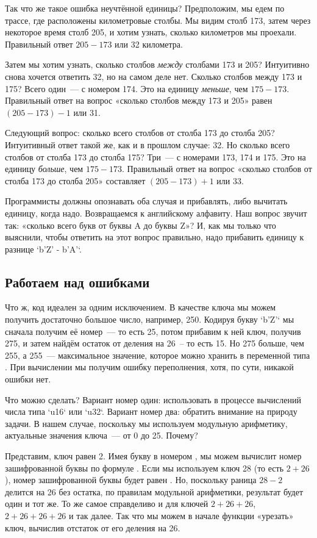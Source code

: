 Так что же такое ошибка неучтённой единицы?
Предположим, мы едем по трассе, где расположены километровые столбы.
Мы видим столб 173, затем через некоторое время столб 205, и хотим узнать, сколько километров мы проехали.
Правильный ответ $205 - 173$ или 32 километра.

Затем мы хотим узнать, сколько столбов {\em между} столбами 173 и 205?
Интуитивно снова хочется ответить 32, но на самом деле нет.
Сколько столбов между 173 и 175? Всего один~--- с номером 174.
Это на единицу {\em меньше}, чем $175 - 173$.
Правильный ответ на вопрос «сколько столбов между 173 и 205» равен $(205 - 173) - 1$ или 31.

Следующий вопрос: сколько всего столбов от столба 173 до столба 205?
Интуитивный ответ такой же, как и в прошлом случае: 32.
Но сколько всего столбов от столба 173 до столба 175? Три~--- с номерами 173, 174 и 175.
Это на единицу {\em больше}, чем $175 - 173$.
Правильный ответ на вопрос «сколько столбов от столба 173 до столба 205» составляет $(205 - 173) + 1$ или 33.

Программисты должны опознавать оба случая и прибавлять, либо вычитать единицу, когда надо.
Возвращаемся к английскому алфавиту. Наш вопрос звучит так: «сколько всего букв от буквы A до буквы Z»?
И, как мы только что выяснили, чтобы ответить на этот вопрос правильно, надо прибавить единицу к разнице `b'Z' - b'A'`.

\subsection{Работаем над ошибками}

Что ж, код идеален за одним исключением. В качестве ключа мы можем получить достаточно большое число, например, 250.
Кодируя букву `b'Z'` мы сначала получим её номер~--- то есть 25, потом прибавим к ней ключ, получив 275, и затем найдём остаток от деления на 26~-- то есть 15.
Но 275 больше, чем 255, а 255~--- максимальное значение, которое можно хранить в переменной типа .
При вычислении мы получим ошибку переполнения, хотя, по сути, никакой ошибки нет.

Что можно сделать?
Вариант номер один: использовать в процессе вычислений числа типа `u16` или `u32`.
Вариант номер два: обратить внимание на природу задачи.
В нашем случае, поскольку мы используем модульную арифметику, актуальные значения ключа — от 0 до 25.
Почему?

Представим, ключ равен 2. Имея букву в номером , мы можем вычислит номер зашифрованной буквы по формуле .
Если мы используем ключ 28 (то есть $2 + 26$), номер зашифрованной буквы будет равен .
Но, поскольку раница $28-2$ делится на 26 без остатка, по правилам модульной арифметики, результат будет один и тот же.
То же самое справделиво и для ключей $2 + 26 + 26$, $2 + 26 + 26 + 26$ и так далее.
Так что мы можем в начале функции «урезать» ключ, вычислив отстаток от его деления на 26.

